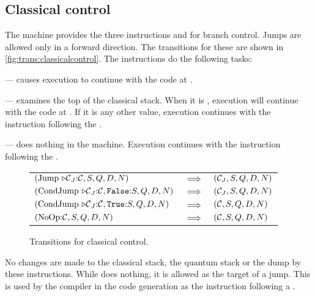 \subsection{Classical control}\label{subsec:classicalcontrol}
The machine provides the three instructions  and
 for branch control. Jumps are allowed only in a
forward direction. The transitions for these are shown in 
\vref{fig:trans:classicalcontrol}. The instructions do the following tasks:
\begin{description}
\item{} --- causes execution to continue with 
the code at .
\item{} --- examines the top of the classical stack. 
When it is \qsmfalse, execution will continue with 
the code at . If it is any other value, execution continues with
the instruction following the .
\item{} --- does nothing in the machine. Execution continues with 
the instruction following the .
\end{description}

\begin{figure}[htbp]

\begin{tabular}{lll}
$(\mathrm{Jump}\ \lbl_J{:}\cd,S,Q,D,N) $&$\implies $&$ ({\mathcal{C}}_J,S,Q,D,N)$ \\[12pt]
$(\mathrm{CondJump}\ {\triangleright\mathcal{C}}_J{:}\mathcal{C}, \text{\texttt{False}}{}{:}S,Q,D,N) $ &$\implies $&$ ({\mathcal{C}}_J,S,Q,D,N)$ \\[12pt]
$(\mathrm{CondJump}\ {\triangleright\mathcal{C}}_J{:}\mathcal{C}, \text{\texttt{True}}{:}S,Q,D,N) $ &$\implies $&$ (\mathcal{C},S,Q,D,N)$ \\[12pt]
$(\mathrm{NoOp}{:}\mathcal{C}, S,Q,D,N) $ &$\implies $&$ (\mathcal{C},S,Q,D,N)$ 
\end{tabular}
\caption{Transitions for classical control.}\label{fig:trans:classicalcontrol}
\end{figure}


 No changes are made to the classical stack,
the quantum stack or the dump by these instructions.
While  does nothing, it is allowed as the target of a jump. 
This is 
used by the \lqpl{} compiler in the  code generation 
 as the instruction following a .


